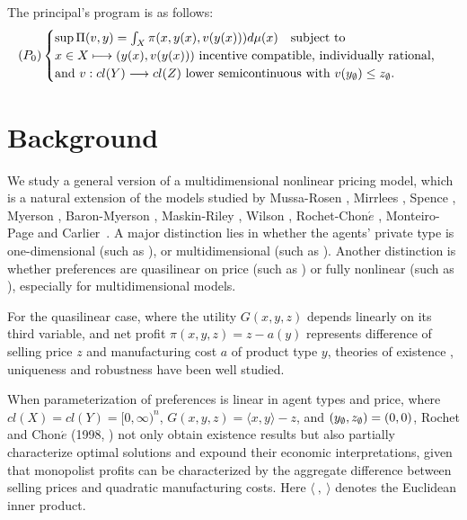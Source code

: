 \begin{proposition}
	The principal's program is as follows:
	\begin{equation*}
	(P_0)
	\begin{cases}
	\sup \Pi(v,y)=\int_{X} \pi(x, y(x), v(y(x))) d\mu(x)\quad \text{subject to}\\ 
	x \in X \longmapsto (y(x),v(y(x))) \text{  incentive compatible,  individually rational,}\\ 
	{ \text{and}\ v:cl(Y)\longrightarrow cl (Z)\  \text{lower semicontinuous with}\ v(y_{\emptyset}) \le z_{\emptyset}}. 
	\end{cases}
	\end{equation*}
\end{proposition}

\medskip


\section{Background}
We study a general version of a multidimensional nonlinear pricing model,  which is a natural extension of the models studied by Mussa-Rosen \cite{MussaRosen78}, %
Mirrlees \cite{Mirrlees71},	Spence \cite{Spence74, Spence80}, Myerson \cite{Myerson81}, Baron-Myerson \cite{BaronMyerson82}, Maskin-Riley \cite{MaskinRiley84}, Wilson \cite{Wilson93}, Rochet-Chon$\acute{e}$ \cite{RochetChone98}, Monteiro-Page \cite{MonteiroPage98} and  Carlier~\cite{Carlier01}. A major distinction lies in whether the agents' private type is one-dimensional (such as \cite{MussaRosen78, MaskinRiley84}), or multidimensional (such as \cite{QuinziiRochet85, RochetChone98,MonteiroPage98, Carlier01}). Another distinction is whether preferences are quasilinear on price (such as \cite{Armstrong96, Carlier01}) or fully nonlinear (such as \cite{NoldekeSamuelson15p, McCannZhang17}), especially for multidimensional models.  
	\medskip



	For the quasilinear case, where the utility $G(x,y,z)$ depends linearly on its third variable, and net profit $\pi(x,y,z)=z-a(y)$ represents difference of selling price $z$ and manufacturing cost $a$ of product type $y$, theories of existence \cite{Basov05,RochetStole03,Carlier01,MonteiroPage98}, uniqueness 
	\cite{CarlierLachand-Robert01,FigalliKimMcCann11,MussaRosen78,RochetChone98} 
	and robustness \cite{Basov05,FigalliKimMcCann11} have been well studied.
\medskip

When parameterization of preferences is linear in agent types and price, where $ cl(X) = cl(Y) = [0,\infty)^n$, $G(x,y,z) = \langle x,y \rangle -z$,  %
and $(y_{\emptyset},z_{\emptyset})=(0,0)$, Rochet and Chon$\acute{e}$ (1998, \cite{RochetChone98}) not only obtain existence results but also partially characterize optimal solutions and expound their economic interpretations, %
given that monopolist profits can be characterized by {the aggregate difference between selling prices and quadratic manufacturing costs.} Here $\langle\ ,\ \rangle$ denotes the Euclidean inner product.\medskip

